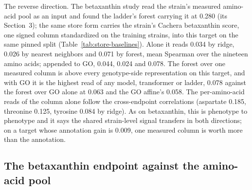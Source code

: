 

The reverse direction. The betaxanthin study read the strain's measured amino-acid pool
as an input and found the ladder's forest carrying it at 0.280 (its Section~3); the
same store form carries the strain's Cachera betaxanthin score, one signed column
standardized on the training strains, into this target on the same pinned split
(Table~\ref{tab:store-baselines}). Alone it reads 0.034 by ridge, 0.026 by nearest
neighbors and 0.071 by forest, mean Spearman over the nineteen amino acids; appended to
GO, 0.044, 0.024 and 0.078. The forest over one measured column is above every
genotype-side representation on this target, and with GO it is the highest read of any
model, transformer or ladder, 0.078 against the forest over GO alone at 0.063 and the
GO affine's 0.058. The per-amino-acid reads of the column alone follow the
cross-endpoint correlations (aspartate 0.185, threonine 0.125, tyrosine 0.084 by
ridge). As on betaxanthin, this is phenotype to phenotype and it says the shared
strain-level signal transfers in both directions; on a target whose annotation gain is
0.009, one measured column is worth more than the annotation.

\subsection{The betaxanthin endpoint against the amino-acid pool}
\label{sec:cross-target}

